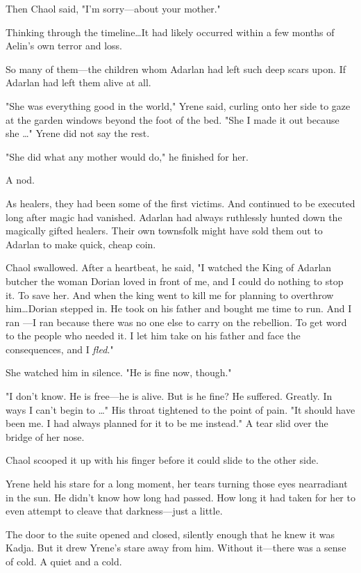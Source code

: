 Then Chaol said, "I'm sorry---about your mother."

Thinking through the timeline\ldots It had likely occurred within a few months of Aelin's own terror and loss.

So many of them---the children whom Adarlan had left such deep scars upon.
If Adarlan had left them alive at all.

"She was everything good in the world," Yrene said, curling onto her side to gaze at the garden windows beyond the foot of the bed.
"She  I made it out because she \ldots" Yrene did not say the rest.

"She did what any mother would do," he finished for her.

A nod.

As healers, they had been some of the first victims.
And continued to be executed long after magic had vanished.
Adarlan had always ruthlessly hunted down the magically gifted healers.
Their own townsfolk might have sold them out to Adarlan to make quick, cheap coin.

Chaol swallowed.
After a heartbeat, he said, "I watched the King of Adarlan butcher the woman Dorian loved in front of me, and I could do nothing to stop it.
To save her.
And when the king went to kill me for planning to overthrow him\ldots Dorian stepped in.
He took on his father and bought me time to run.
And I ran ---I ran because 
there was no one else to carry on the rebellion.
To get word to the people who needed it.
I let him take on his father and face the consequences, and I \emph{fled}."

She watched him in silence.
"He is fine now, though."

"I don't know.
He is free---he is alive.
But is he fine?
He suffered.
Greatly.
In ways I can't begin to \ldots" His throat tightened to the point of pain.
"It should have been me.
I had always planned for it to be me instead."
A tear slid over the bridge of her nose.

Chaol scooped it up with his finger before it could slide to the other side.

Yrene held his stare for a long moment, her tears turning those eyes nearradiant in the sun.
He didn't know how long had passed.
How long it had taken for her to even attempt to cleave that darkness---just a little.

The door to the suite opened and closed, silently enough that he knew it was Kadja.
But it drew Yrene's stare away from him.
Without it---there was a sense of cold.
A quiet and a cold.

